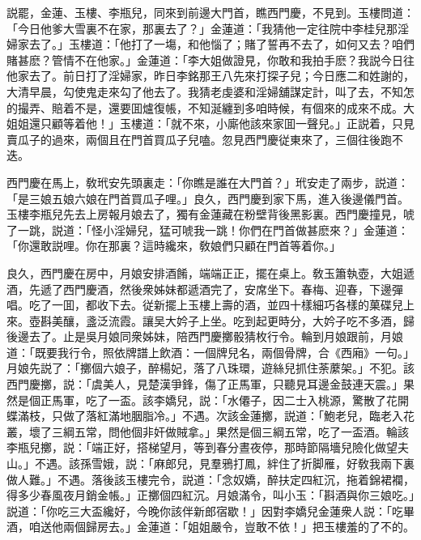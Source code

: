 説罷，金蓮、玉樓、李瓶兒，同來到前邊大門首，瞧西門慶，不見到。玉樓問道：「今日他爹大雪裏不在家，那裏去了？」金蓮道：「我猜他一定往院中李桂兒那淫婦家去了。」玉樓道：「他打了一塲，和他惱了；賭了誓再不去了，如何又去？咱們賭甚麽？管情不在他家。」金蓮道：「李大姐做證見，你敢和我拍手麽？我説今日往他家去了。前日打了淫婦家，昨日李銘那王八先來打探子兒；今日應二和姓謝的，大清早晨，勾使鬼走來勾了他去了。我猜老虔婆和淫婦舖謀定計，叫了去，不知怎的撮弄、賠着不是，還要囬爐復帳，不知涎纏到多咱時候，有個來的成來不成。大姐姐還只顧等着他！」玉樓道：「就不來，小廝他該來家囬一聲兒。」正説着，只見賣瓜子的過來，兩個且在門首買瓜子兒嗑。忽見西門慶従東來了，三個往後跑不迭。

西門慶在馬上，敎玳安先頭裏走：「你瞧是誰在大門首？」玳安走了兩步，説道：「是三娘五娘六娘在門首買瓜子哩。」良久，西門慶到家下馬，進入後邊儀門首。玉樓李瓶兒先去上房報月娘去了，獨有金蓮藏在粉壁背後黑影裏。西門慶撞見，唬了一跳，説道：「怪小淫婦兒，猛可唬我一跳！你們在門首做甚麽來？」金蓮道：「你還敢説哩。你在那裏？這時纔來，敎娘們只顧在門首等着你。」

良久，西門慶在房中，月娘安排酒餚，端端正正，擺在桌上。敎玉簫執壺，大姐遞酒，先遞了西門慶酒，然後衆姊妹都遞酒完了，安席坐下。春梅、迎春，下邊彈唱。吃了一囬，都收下去。従新擺上玉樓上壽的酒，並四十樣細巧各樣的菓碟兒上來。壺斟美釀，盞泛流霞。讓吴大妗子上坐。吃到起更時分，大妗子吃不多酒，歸後邊去了。止是吳月娘同衆姊妹，陪西門慶擲骰猜枚行令。輪到月娘跟前，月娘道：「既要我行令，照依牌譜上飲酒：一個牌兒名，兩個骨牌，合《西廂》一句。」月娘先説了：「擲個六娘子，醉楊妃，落了八珠環，遊絲兒抓住荼䕷架。」不犯。該西門慶擲，説：「虞美人，見楚漢爭鋒，傷了正馬軍，只聽見耳邊金鼓連天震。」果然是個正馬軍，吃了一盃。該李嬌兒，説：「水僊子，因二士入桃源，驚散了花開蝶滿枝，只做了落紅滿地胭脂冷。」不遇。次該金蓮擲，説道：「鮑老兒，臨老入花叢，壞了三綱五常，問他個非奸做賊拿。」果然是個三綱五常，吃了一盃酒。輪該李瓶兒擲，説：「端正好，搭梯望月，等到春分晝夜停，那時節隔墻兒險化做望夫山。」不遇。該孫雪娥，説：「麻郎兒，見羣鴉打鳳，絆住了折脚雁，好敎我兩下裏做人難。」不遇。落後該玉樓完令，説道：「念奴嬌，醉扶定四紅沉，拖着錦裙襴，得多少春風夜月銷金帳。」正擲個四紅沉。月娘滿令，叫小玉：「斟酒與你三娘吃。」説道：「你吃三大盃纔好，今晚你該伴新郎宿歇！」因對李嬌兒金蓮衆人説：「吃畢酒，咱送他兩個歸房去。」金蓮道：「姐姐嚴令，豈敢不依！」把玉樓羞的了不的。

